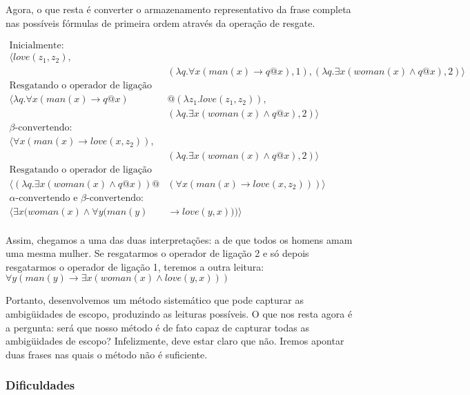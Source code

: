 Agora, o que resta é converter o armazenamento representativo da frase completa nas possíveis fórmulas de primeira ordem através da operação de resgate. 

\begin{align*}
 \text{Inicialmente:} \\
 \langle love(z_1,z_2),& \\ &(\lambda q. \forall x(man(x) \rightarrow q@x), 1),  (\lambda q. \exists x(woman(x) \land q@x),2) \rangle \\
 \text{Resgatando o operador de ligação 1:}  \\
 \langle \lambda q. \forall x(man(x) \rightarrow q@x) &@ (\lambda z_1 . love(z_1,z_2)),  \\&(\lambda q. \exists x(woman(x) \land q@x),2)\rangle \\
 \beta\text{-convertendo:} \\
 \langle \forall x (man(x) \rightarrow love(x,z_2)), &\\&(\lambda q. \exists x(woman(x) \land q@x),2)\rangle \\
 \text{Resgatando o operador de ligação 2:} \\
 \langle (\lambda q. \exists x(woman(x) \land q@x))@&(\forall x (man(x) \rightarrow love(x,z_2))) \rangle  \\
 \alpha\text{-convertendo e }  \beta\text{-convertendo:} \\
 \langle \exists x (woman(x) \land \forall y(man(y) &\rightarrow love(y,x))) \rangle  \\
\end{align*}

Assim, chegamos a uma das duas interpretações: a de que todos os homens amam uma mesma mulher. Se resgatarmos o operador de ligação 2 e só depois resgatarmos o operador de ligação 1, teremos a outra leitura: $\forall y(man(y) \rightarrow \exists x (woman (x) \land love(y,x)))$

Portanto, desenvolvemos um método sistemático que pode capturar as ambigüidades de escopo, produzindo as leituras possíveis. O que nos resta agora é a pergunta: será que nosso método é de fato capaz de capturar todas as ambigüidades de escopo? Infelizmente, deve estar claro que não. Iremos apontar duas frases nas quais o método não é suficiente.

\subsubsection{Dificuldades}

